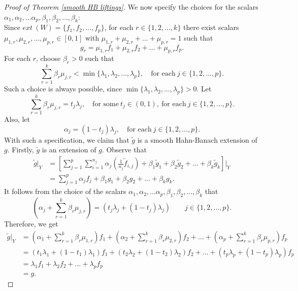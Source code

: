 \documentclass[10pt,a4paper]{amsart}
\begin{document}
\begin{proof}[Proof of Theorem \ref{smooth HB liftings}]
\noindent We now specify the choices for the scalars $\alpha_1, \alpha_2,\dots \alpha_p, \beta_{1}, \beta_{2}, \dots, \beta_k$:\\

\noindent Since $ext~(W)=\{f_1,f_2,\dots,f_p\}$, for each $r\in \{1,2,\dots, k\}$ there exist scalars $\mu_{1,r},\mu_{2,r}, \dots, \mu_{p,r}\in [0,1]$ with $\mu_{1,r}+\mu_{2,r}+ \dots +\mu_{p,r}=1$ such that
\[
g_{r}=\mu_{1,r}f_1+\mu_{2,r}f_2+ \dots +\mu_{p,r}f_p.
\]
For each $r$, choose $\beta_{r}>0$ such that
\[
\sum_{r=1}^{k}\beta_{r}\mu_{j,r}<\min\{\lambda_1,\lambda_2,\dots, \lambda_p\}, \quad \text{for each}~j\in \{1,2,\dots, p\}.
\]
Such a choice is always possible, since $\min\{\lambda_1,\lambda_2,\dots, \lambda_p\}>0$. Let
\[
\sum_{r=1}^{k}\beta_{r}\mu_{j,r}=t_j\lambda_j,\quad \text{for some}~t_j\in (0,1),~\text{for each}~j\in \{1,2,\dots, p\}.
\]
Also, let
\[
\alpha_j=(1-t_j)\lambda_j, \quad \text{for each}~j\in \{1,2,\dots, p\}.
\]
With such a specification, we claim that $\widetilde{g}$ is a smooth Hahn-Banach extension of $g$. Firstly, $\widetilde{g}$ is an extension of $g$. Observe that
\begin{align*}
\widetilde{g}\lvert_Y & = \left[\sum_{j=1}^p\sum_{i=1}^{n_j}\alpha_j(\frac{1}{n_j}\widetilde{f}_{i,j})+\beta_{1}\widetilde{g}_{1}+\beta_{2}\widetilde{g}_{2}+\dots+\beta_{k}\widetilde{g}_k\right]\Bigg\lvert_Y\\
& = \sum_{j=1}^p\alpha_jf_j+\beta_{1}g_{1}+\beta_{2}g_{2}+\dots+\beta_{k}g_k.
\end{align*}
It follows from the choice of the scalars $\alpha_1, \alpha_2,\dots \alpha_p, \beta_{1}, \beta_{2}, \dots, \beta_k$ that
\[
(\alpha_j+\sum_{r=1}^{k}\beta_{r}\mu_{j,r}) = (t_j\lambda_j+(1-t_j)\lambda_j) \qquad j\in \{1,2,\dots,p\}.
\]
Therefore, we get
\begin{align*}
\widetilde{g}\lvert_Y & = (\alpha_1+\sum_{r=1}^{k}\beta_{r}\mu_{1,r})f_1+(\alpha_2+\sum_{r=1}^{k}\beta_{r}\mu_{2,r})f_2+\dots+(\alpha_p+\sum_{r=1}^{k}\beta_{r}\mu_{p,r})f_p\\
& = (t_1\lambda_1+(1-t_1)\lambda_1)f_1+(t_2\lambda_2+(1-t_2)\lambda_2)f_2+\dots+(t_p\lambda_p+(1-t_p)\lambda_p)f_p\\
& = \lambda_1f_1+\lambda_2f_2+\dots+\lambda_pf_p\\
& = g.
\end{align*}

\medskip



\end{proof}
\end{document}
